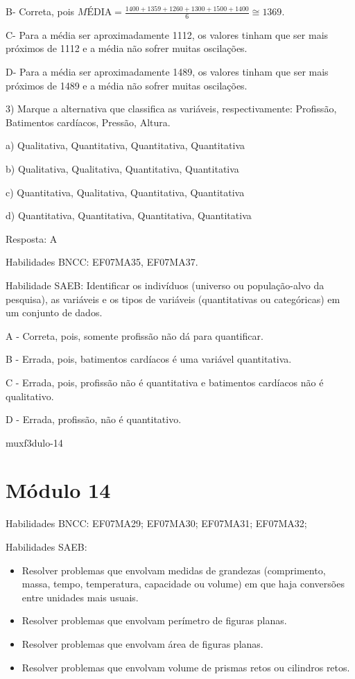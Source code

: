 {B- Correta, pois
\(MÉ\text{DIA} = \frac{1400 + 1359 + 1260 + 1300 + 1500 + 1400}{6} \cong 1369\).

C- Para a média ser aproximadamente 1112, os valores tinham que ser mais
próximos de 1112 e a média não sofrer muitas oscilações.

D- Para a média ser aproximadamente 1489, os valores tinham que ser mais
próximos de 1489 e a média não sofrer muitas oscilações.

3) Marque a alternativa que classifica as variáveis, respectivamente:
Profissão, Batimentos cardíacos, Pressão, Altura.

a) Qualitativa, Quantitativa, Quantitativa, Quantitativa

b) Qualitativa, Qualitativa, Quantitativa, Quantitativa

c) Quantitativa, Qualitativa, Quantitativa, Quantitativa

d) Quantitativa, Quantitativa, Quantitativa, Quantitativa

Resposta: A

Habilidades BNCC: EF07MA35, EF07MA37.

Habilidade SAEB: Identificar os indivíduos (universo ou população-alvo
da pesquisa), as variáveis e os tipos de variáveis (quantitativas ou
categóricas) em um conjunto de dados.

A - Correta, pois, somente profissão não dá para quantificar.

B - Errada, pois, batimentos cardíacos é uma variável quantitativa.

C - Errada, pois, profissão não é quantitativa e batimentos cardíacos
não é qualitativo.

D - Errada, profissão, não é quantitativo.

muxf3dulo-14}{%
\section{Módulo 14}

Habilidades BNCC: EF07MA29; EF07MA30; EF07MA31; EF07MA32;

Habilidades SAEB:

\begin{itemize}
\item
  Resolver problemas que envolvam medidas de grandezas (comprimento,
  massa, tempo, temperatura, capacidade ou volume) em que haja
  conversões entre unidades mais usuais.
\item
  Resolver problemas que envolvam perímetro de figuras planas.
\item
  Resolver problemas que envolvam área de figuras planas.
\item
  Resolver problemas que envolvam volume de prismas retos ou cilindros
  retos.
\end{itemize}

}
